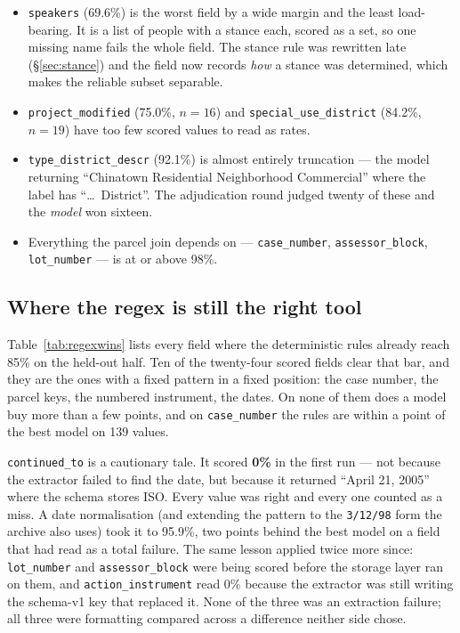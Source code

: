 \documentclass[11pt]{article}
\begin{document}
\begin{itemize}
\item \texttt{speakers} (69.6\%) is the worst field by a wide margin and the least
load-bearing. It is a list of people with a stance each, scored as a set, so one missing name
fails the whole field. The stance rule was rewritten late (\S\ref{sec:stance}) and the field
now records \emph{how} a stance was determined, which makes the reliable subset separable.
\item \texttt{project\_modified} (75.0\%, $n=16$) and \texttt{special\_use\_district}
(84.2\%, $n=19$) have too few scored values to read as rates.
\item \texttt{type\_district\_descr} (92.1\%) is almost entirely truncation --- the model
returning ``Chinatown Residential Neighborhood Commercial'' where the label has
``\ldots\ District''. The adjudication round judged twenty of these and the \emph{model} won
sixteen.
\item Everything the parcel join depends on --- \texttt{case\_number},
\texttt{assessor\_block}, \texttt{lot\_number} --- is at or above 98\%.
\end{itemize}

\subsection{Where the regex is still the right tool}

Table~\ref{tab:regexwins} lists every field where the deterministic rules already reach 85\%
on the held-out half. Ten of the twenty-four scored fields clear that bar, and they are the
ones with a fixed pattern in a fixed position: the case number, the parcel keys, the
numbered instrument, the dates. On none of them does a model buy more than a few points, and
on \texttt{case\_number} the rules are within a point of the best model on 139 values.

\texttt{continued\_to} is a cautionary tale. It scored \textbf{0\%} in the first run --- not
because the extractor failed to find the date, but because it returned ``April 21, 2005''
where the schema stores ISO. Every value was right and every one counted as a miss. A date
normalisation (and extending the pattern to the \texttt{3/12/98} form the archive also uses)
took it to 95.9\%, two points behind the best model on a field that had read as a total
failure. The same lesson applied twice more since: \texttt{lot\_number} and
\texttt{assessor\_block} were being scored before the storage layer ran on them, and
\texttt{action\_instrument} read 0\% because the extractor was still writing the schema-v1
key that replaced it. None of the three was an extraction failure; all three were formatting
compared across a difference neither side chose.
\end{document}
